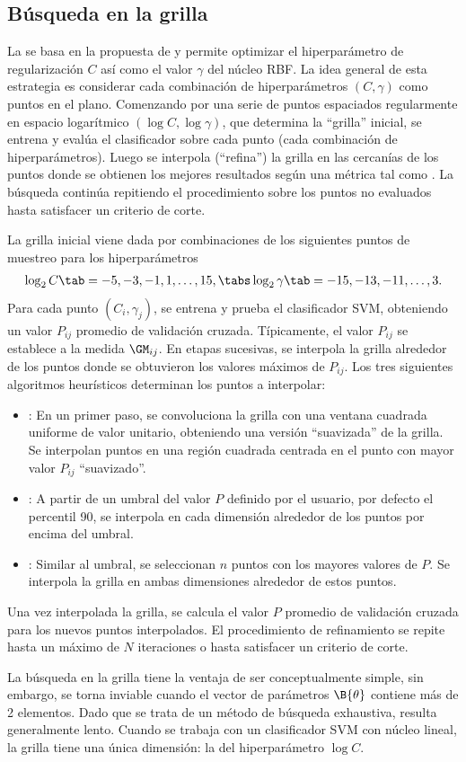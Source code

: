 %
%
\subsection{Búsqueda en la grilla}
%
La  se basa en la propuesta de \cite{hsu} y
permite optimizar el hiperparámetro de regularización $C$ así como el
valor $\gamma$ del núcleo RBF.
La idea general de esta estrategia es considerar cada combinación de
hiperparámetros $(C,\gamma)$ como puntos en el plano.
Comenzando por una serie de puntos espaciados regularmente
en espacio logarítmico $(\log C,\log\gamma)$, que determina la
``grilla'' inicial, se entrena y evalúa el clasificador sobre cada
punto (cada combinación de hiperparámetros).
Luego se interpola (``refina'') la grilla en las cercanías de los
puntos donde se obtienen los mejores resultados según una métrica tal
como \GM.
La búsqueda continúa repitiendo el procedimiento sobre los puntos no
evaluados hasta satisfacer un criterio de corte.

La grilla inicial viene dada por combinaciones de los siguientes
puntos de muestreo para los hiperparámetros
%
\begin{align}
  \label{initial-grid}
  \log_2 C     \tab= -5, -3, -1, 1, \ldots, 15, \tabs
  \log_2\gamma \tab= -15,-13, -11, \ldots, 3.
\end{align}
%
Para cada punto $(C_i,\gamma_j)$, se entrena y prueba el clasificador
SVM, obteniendo un valor $P_{ij}$ promedio de validación cruzada.
Típicamente, el valor $P_{ij}$ se establece a la medida $\GM_{ij}$.
En etapas sucesivas, se interpola la grilla alrededor de los puntos
donde se obtuvieron los valores máximos de $P_{ij}$.
Los tres siguientes algoritmos heurísticos determinan los puntos a
interpolar:
%
\begin{itemize}
\item
  : En un primer paso, se convoluciona la grilla con una
  ventana cuadrada uniforme de valor unitario, obteniendo una versión
  ``suavizada'' de la grilla.  Se interpolan puntos en una región
  cuadrada centrada en el punto con mayor valor $P_{ij}$
  ``suavizado''.
\item
  : A partir de un umbral del valor $P$ definido por el
  usuario, por defecto el percentil 90, se interpola en cada dimensión
  alrededor de los puntos por encima del umbral.
\item
  : Similar al umbral, se seleccionan $n$ puntos
  con los mayores valores de $P$.
  Se interpola la grilla en ambas dimensiones alrededor de estos
  puntos.
\end{itemize}
%
Una vez interpolada la grilla, se calcula el valor $P$ promedio de
validación cruzada para los nuevos puntos interpolados.
El procedimiento de refinamiento se repite hasta un máximo de $N$
iteraciones o hasta satisfacer un criterio de corte.

La búsqueda en la grilla tiene la ventaja de ser conceptualmente
simple, sin embargo, se torna inviable cuando el vector de parámetros
$\B{\theta}$ contiene más de 2 elementos.
Dado que se trata de un método de búsqueda exhaustiva, resulta
generalmente lento.
Cuando se trabaja con un clasificador SVM con núcleo lineal, la grilla
tiene una única dimensión: la del hiperparámetro $\log C$.
